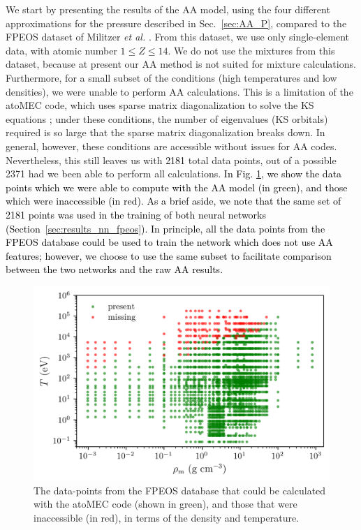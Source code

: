 \documentclass[%
 preprint,
 superscriptaddress,
 amsmath,amssymb,
longbibliography,
]{revtex4-2}
\newcommand{\change}[1]{\textcolor{black}{#1}}
\begin{document}
We start by presenting the results of the AA model, using the four different approximations for the pressure described in Sec.~\ref{sec:AA_P}, compared to the FPEOS dataset of Militzer \emph{et al.} \cite{Militzer_EOS_database}. From this dataset, we use only single-element data, with atomic number $1\leq Z\leq 14$. We do not use the mixtures from this dataset, because at present our AA method is not suited for mixture calculations. Furthermore, for a small subset of the conditions (high temperatures and low densities), we were unable to perform AA calculations. This is a limitation of the atoMEC code, which uses sparse matrix diagonalization to solve the KS equations \cite{SciPy_atoMEC}; under these conditions, the number of eigenvalues (KS orbitals) required is so large that the sparse matrix diagonalization breaks down. In general, however, these conditions are accessible without issues for AA codes. Nevertheless, this still leaves us with \change{2181} total data points, out of a possible 2371 had we been able to perform all calculations. \change{In Fig. \ref{fig:aa_missing}, we show the data points which we were able to compute with the AA model (in green), and those which were inaccessible (in red). As a brief aside, we note that the same set of 2181 points was used in the training of both neural networks (Section~\ref{sec:results_nn_fpeos}). In principle, all the data points from the FPEOS database \cite{Militzer_EOS_database} could be used to train the network which does not use AA features; however, we choose to use the same subset to facilitate comparison between the two networks and the raw AA results.}

\begin{figure}
    \centering
    \includegraphics{../figs/aa_missing.png}
    \caption{The data-points from the FPEOS database \cite{Militzer_EOS_database} that could be calculated with the atoMEC code (shown in green), and those that were inaccessible (in red), in terms of the density and temperature.}
    \label{fig:aa_missing}
\end{figure}
\end{document}
